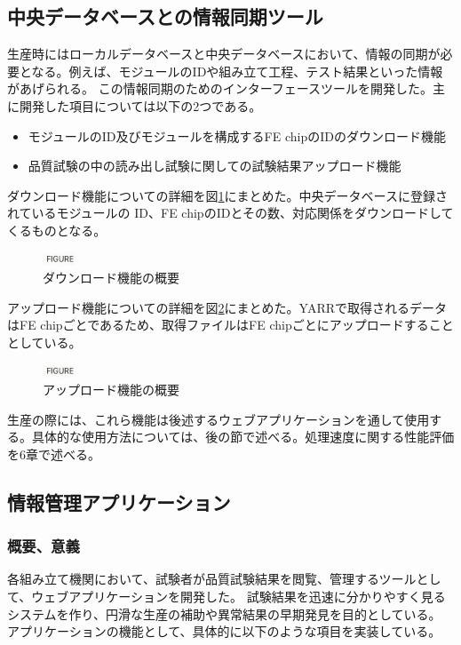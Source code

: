 \subsection{中央データベースとの情報同期ツール}
生産時にはローカルデータベースと中央データベースにおいて、情報の同期が必要となる。例えば、モジュールのIDや組み立て工程、テスト結果といった情報があげられる。
この情報同期のためのインターフェースツールを開発した。主に開発した項目については以下の2つである。
\begin{itemize}
  \item モジュールのID及びモジュールを構成するFE chipのIDのダウンロード機能
  \item 品質試験の中の読み出し試験に関しての試験結果アップロード機能
\end{itemize}

ダウンロード機能についての詳細を図\ref{pd_download_info}にまとめた。中央データベースに登録されているモジュールの ID、FE chipのIDとその数、対応関係をダウンロードしてくるものとなる。
\begin{figure}[bpt]\centering
\includegraphics[width=1cm]{figure}
\caption[ダウンロード機能の概要]{ダウンロード機能の概要}
\label{pd_download_info}
\end{figure}

アップロード機能についての詳細を図\ref{pd_upload_info}にまとめた。YARRで取得されるデータはFE chipごとであるため、取得ファイルはFE chipごとにアップロードすることとしている。

\begin{figure}[bpt]\centering
\includegraphics[width=1cm]{figure}
\caption[アップロード機能の概要]{アップロード機能の概要}
\label{pd_upload_info}
\end{figure}

生産の際には、これら機能は後述するウェブアプリケーションを通して使用する。具体的な使用方法については、後の節で述べる。処理速度に関する性能評価を6章で述べる。

\subsection{情報管理アプリケーション}
\subsubsection{概要、意義}
各組み立て機関において、試験者が品質試験結果を閲覧、管理するツールとして、ウェブアプリケーションを開発した。
試験結果を迅速に分かりやすく見るシステムを作り、円滑な生産の補助や異常結果の早期発見を目的としている。
アプリケーションの機能として、具体的に以下のような項目を実装している。

